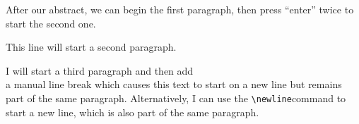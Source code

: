 \documentclass{article}
\begin{document}
	\begin{abstract}
		This is a simple paragraph at the beginning of the document. A brief introduction about the main subject.
	\end{abstract}
	
	After our abstract, we can begin the first paragraph, then press ``enter'' twice to start the second one.
	
	This line will start a second paragraph.
	
	 I will start a third paragraph and then add \\ a manual line break which causes this text to start on a new line but remains part of the same paragraph. Alternatively, I can use the \verb|\newline|\newline command to start a new line, which is also part of the same paragraph.
\end{document}
